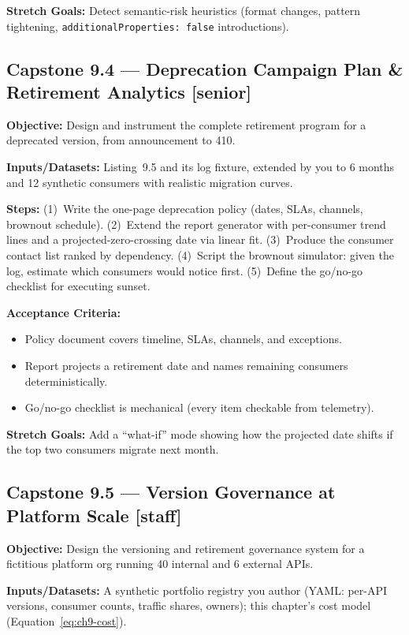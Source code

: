 \textbf{Stretch Goals:} Detect semantic-risk heuristics (format changes,
pattern tightening, \texttt{additionalProperties: false} introductions).

\subsection*{Capstone 9.4 --- Deprecation Campaign Plan \& Retirement Analytics \hfill [senior]}
\textbf{Objective:} Design and instrument the complete retirement program for
a deprecated version, from announcement to 410.

\textbf{Inputs/Datasets:} Listing~9.5 and its log fixture, extended by you to
6 months and 12 synthetic consumers with realistic migration curves.

\textbf{Steps:} (1)~Write the one-page deprecation policy (dates, SLAs,
channels, brownout schedule). (2)~Extend the report generator with
per-consumer trend lines and a projected-zero-crossing date via linear
fit. (3)~Produce the consumer contact list ranked by dependency.
(4)~Script the brownout simulator: given the log, estimate which consumers
would notice first. (5)~Define the go/no-go checklist for executing sunset.

\textbf{Acceptance Criteria:}
\begin{itemize}
  \item[$\square$] Policy document covers timeline, SLAs, channels, and
        exceptions.
  \item[$\square$] Report projects a retirement date and names remaining
        consumers deterministically.
  \item[$\square$] Go/no-go checklist is mechanical (every item checkable
        from telemetry).
\end{itemize}

\textbf{Stretch Goals:} Add a ``what-if'' mode showing how the projected date
shifts if the top two consumers migrate next month.

\subsection*{Capstone 9.5 --- Version Governance at Platform Scale \hfill [staff]}
\textbf{Objective:} Design the versioning and retirement governance system
for a fictitious platform org running 40 internal and 6 external APIs.

\textbf{Inputs/Datasets:} A synthetic portfolio registry you author (YAML:
per-API versions, consumer counts, traffic shares, owners); this chapter's
cost model (Equation~\ref{eq:ch9-cost}).

